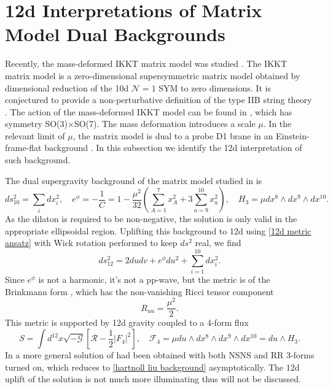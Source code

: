 \section{12d Interpretations of Matrix Model Dual Backgrounds}
\label{sec:IKKT uplift}
Recently, the mass-deformed IKKT matrix model \cite{Bonelli:2002mb,Ishibashi:1996xs} was studied \cite{Hartnoll:2024csr,Komatsu:2024bop}.
The IKKT matrix model is a zero-dimensional supersymmetric matrix model obtained by dimensional reduction of the 10d $\mathcal N=1$ SYM to zero dimensions.
It is conjectured to provide a non-perturbative definition of the type IIB string theory \cite{Ishibashi:1996xs,Ciceri:2025wpb,Banks:1996vh}.
The action of the mass-deformed IKKT model can be found in \cite{Hartnoll:2024csr}, which has symmetry SO(3)$\times$SO(7).
The mass deformation introduces a scale $\mu$.
In the relevant limit of $\mu$, the matrix model is dual to a probe D1 brane in an Einstein-frame-flat background \cite{Myers:1999ps,Hartnoll:2024csr}.
In this subsection we identify the 12d interpretation of such background.

The dual supergravity background of the matrix model studied in \cite{Hartnoll:2024csr} is
\begin{equation}
ds_{10}^2 = \sum_i dx_i^2,\quad
e^\phi = -\frac{1}{C} = 1 - \frac{\mu^2}{32}\left(\sum_{A=1}^7x_A^2 + 3\sum_{a=9}^{10}x_a^2\right),\quad
H_3 = \mu dx^8 \wedge dx^9\wedge dx^{10}.
\label{hartnoll liu background}
\end{equation}
As the dilaton is required to be non-negative, the solution is only valid in the appropriate ellipsoidal region. 
Uplifting this background to 12d using \eqref{12d metric ansatz} with Wick rotation performed to keep $ds^2$ real, we find
\begin{equation}
ds_{12}^2 =2dudv + e^\phi du^2 + \sum_{i=1}^{10}dx_i^2.
\end{equation}
Since $e^\phi$ is not a harmonic, it's not a pp-wave, but the metric is of the Brinkmann form \cite{Ortin:2015hya,Brinkmann:1925fr}, which has the non-vanishing Ricci tensor component
\begin{equation}
R_{uu}=\frac{\mu^2}{2}.
\end{equation}
This metric is supported by 12d gravity coupled to a 4-form flux
\begin{equation}
S = \int d^{12}x \sqrt{-\mathcal{G}}\left[\mathcal{R} - \frac{1}{2}|F_4|^2\right],\quad
\mathcal{F}_4 = \mu du\wedge dx^8\wedge dx^9\wedge dx^{10} = du\wedge H_3.
\end{equation}
In \cite{Komatsu:2024bop} a more general solution of \cite{Hartnoll:2024csr} had been obtained with both NSNS and RR 3-forms turned on, which reduces to \eqref{hartnoll liu background} asymptotically.
The 12d uplift of the \cite{Komatsu:2024bop} solution is not much more illuminating thus will not be discussed.